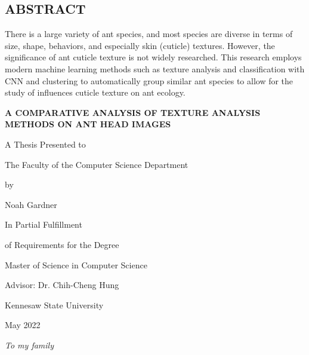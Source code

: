 \documentclass[12pt]{article}
\newcommand{\thesistitle}{
    {\Large A comparative analysis of texture analysis methods on
ant head images}
}
\newcommand{\toppage}{\vspace*{0.3in}}
\begin{document}
\toppage
\begin{center}
    \section*{ABSTRACT}
\end{center}
\vspace{0.5in}

\noindent There is a large variety of ant species, and most species are diverse
in terms of size, shape, behaviors, and especially skin (cuticle) textures.
However, the significance of ant cuticle texture is not widely researched. This
research employs modern machine learning methods such as texture analysis and
classification with CNN and clustering to automatically group similar ant
species to allow for the study of influences cuticle texture on ant ecology.
\newpage

\toppage
\begin{center}
    \textbf{\MakeUppercase{\thesistitle}}
    \vspace{1in}

    A Thesis Presented to

    The Faculty of the Computer Science Department
    \vspace{1in}

    by
    \vspace{0.5in}

    Noah Gardner
    \vspace{1in}

    In Partial Fulfillment

    of Requirements for the Degree

    Master of Science in Computer Science
    \vspace{0.5in}

    Advisor: Dr. Chih-Cheng Hung
    \vspace{0.5in}

    Kennesaw State University

    May 2022
\end{center}
\newpage

\vspace*{\fill}
\begin{center}
    \textit{To my family}
\end{center}
\vspace*{\fill}
\newpage
\end{document}
